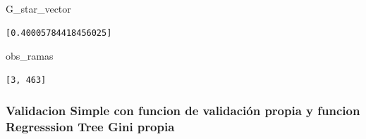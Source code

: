 \documentclass[
  11pt,
  a4paper,
]{article}
\newenvironment{Shaded}{\begin{snugshade}}{\end{snugshade}}
\newcommand{\NormalTok}[1]{#1}
\begin{document}
\begin{Shaded}
\begin{Highlighting}[]
\NormalTok{G\_star\_vector}
\end{Highlighting}
\end{Shaded}

\begin{verbatim}
[0.40005784418456025]
\end{verbatim}

\begin{Shaded}
\begin{Highlighting}[]
\NormalTok{obs\_ramas}
\end{Highlighting}
\end{Shaded}

\begin{verbatim}
[3, 463]
\end{verbatim}

\newpage

\hypertarget{validacion-simple-con-funcion-de-validaciuxf3n-propia-y-funcion-regresssion-tree-gini-propia}{%
\subsubsection{Validacion Simple con funcion de validación propia y
funcion Regresssion Tree Gini
propia}\label{validacion-simple-con-funcion-de-validaciuxf3n-propia-y-funcion-regresssion-tree-gini-propia}}
\end{document}
